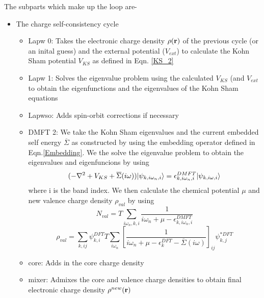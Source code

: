 \documentclass[10pt]{ruthesis}
\begin{document}
The subparts which make up the loop are-
\begin{itemize}
\item The charge self-consistency cycle 
	\begin{itemize}
	 \item Lapw 0: Takes the  electronic charge density $\rho(\mathbf{r})$ of the previous cycle (or an inital guess) and the external potential ($V_{ext}$) to calculate the Kohn Sham potential $V_{KS}$ as defined in Eqn. \ref{KS_2}
	\item Lapw 1: Solves the eigenvalue problem using the calculated $V_{KS}$ (and $V_{ext}$ to obtain the eigenfunctions and the eigenvalues of the Kohn Sham equations
	\item Lapwso: Adds spin-orbit corrections if necessary 
	\item DMFT 2: We take the Kohn Sham eigenvalues and the current embedded self energy $\overline{\Sigma}$ as constructed by using the embedding operator defined in Eqn.\ref{Embedding}. We the solve the eigenvalue problem to obtain the eigenvalues and eigenfuncions by using 
	\begin{equation}
	(-\nabla^2+V_{KS}+\overline{\Sigma}(i\omega)) |\psi_{k,i\omega_n,i} \rangle = \epsilon^{DMFT}_{k,i\omega_n,i}|\psi_{k,i\omega,i} \rangle
	\end{equation}	 
	where i is the band index. We then calculate the chemical potential $\mu$ and new valence charge density $\rho_{val}$ by using
	\begin{equation}
	 N_{val}= T \sum_{i\omega_n,k,i}\dfrac{1}{i\omega_n +\mu -\epsilon^{DMFT}_{k,i\omega_n,i}}
	 \end{equation} 
	 \begin{equation}
	 \rho_{val}=\sum_{k,ij} \psi^{DFT}_{k,i} T \sum_{i\omega_n}\left[\dfrac{1}{i\omega_n +\mu -\epsilon^{DFT}_{k}-\overline{\Sigma}(i\omega)}\right]_{ij}\psi^{*DFT}_{k,j}
	 \end{equation}
	\item core: Adds in the core charge density
	\item mixer: Admixes the core and valence charge densities to obtain final electronic charge density $\rho^{new}(\mathbf{r})$	
	 \end{itemize}
\end{itemize}
\end{document}
